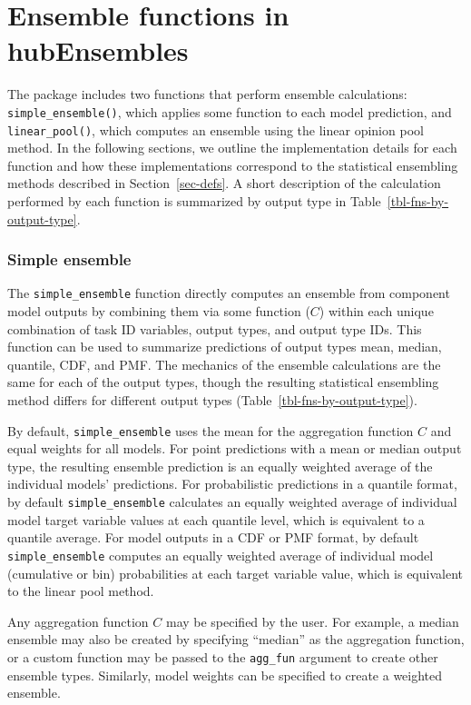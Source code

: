 \documentclass[
  article,
  shortnames,
  notitle]{jss}
\begin{document}
\section{Ensemble functions in hubEnsembles}\label{sec-ens-fns}

The  package includes two functions that perform
ensemble calculations: \texttt{simple\_ensemble()}, which applies some
function to each model prediction, and \texttt{linear\_pool()}, which
computes an ensemble using the linear opinion pool method. In the
following sections, we outline the implementation details for each
function and how these implementations correspond to the statistical
ensembling methods described in Section~\ref{sec-defs}. A short
description of the calculation performed by each function is summarized
by output type in Table~\ref{tbl-fns-by-output-type}.

\subsubsection{Simple ensemble}\label{sec-simple-ensemble}

The \texttt{simple\_ensemble} function directly computes an ensemble
from component model outputs by combining them via some function (\(C\))
within each unique combination of task ID variables, output types, and
output type IDs. This function can be used to summarize predictions of
output types mean, median, quantile, CDF, and PMF. The mechanics of the
ensemble calculations are the same for each of the output types, though
the resulting statistical ensembling method differs for different output
types (Table~\ref{tbl-fns-by-output-type}).

By default, \texttt{simple\_ensemble} uses the mean for the aggregation
function \(C\) and equal weights for all models. For point predictions
with a mean or median output type, the resulting ensemble prediction is
an equally weighted average of the individual models' predictions. For
probabilistic predictions in a quantile format, by default
\texttt{simple\_ensemble} calculates an equally weighted average of
individual model target variable values at each quantile level, which is
equivalent to a quantile average. For model outputs in a CDF or PMF
format, by default \texttt{simple\_ensemble} computes an equally
weighted average of individual model (cumulative or bin) probabilities
at each target variable value, which is equivalent to the linear pool
method.

Any aggregation function \(C\) may be specified by the user. For
example, a median ensemble may also be created by specifying ``median''
as the aggregation function, or a custom function may be passed to the
\texttt{agg\_fun} argument to create other ensemble types. Similarly,
model weights can be specified to create a weighted ensemble.
\end{document}
